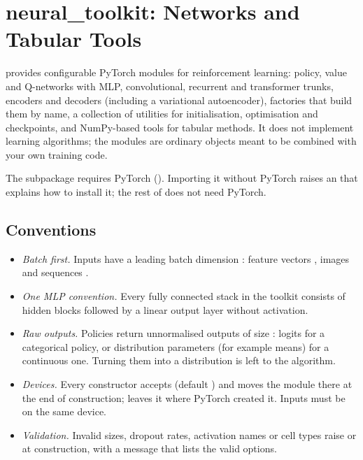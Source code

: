 \chapter{neural\_toolkit: Networks and Tabular Tools}\label{chap:neural}
\begingroup\setlength{\emergencystretch}{3em}%

 provides configurable PyTorch modules for
reinforcement learning: policy, value and Q-networks with MLP, convolutional,
recurrent and transformer trunks, encoders and decoders (including a
variational autoencoder), factories that build them by name, a collection of
utilities for initialisation, optimisation and checkpoints, and NumPy-based
tools for tabular methods. It does not implement learning algorithms; the
modules are ordinary  objects meant to be combined with
your own training code.

The subpackage requires PyTorch (). Importing it
without PyTorch raises an  that explains how to install it;
the rest of  does not need PyTorch.

\section{Conventions}\label{sec:neural-conventions}

\begin{itemize}
  \item \emph{Batch first.} Inputs have a leading batch dimension :
    feature vectors , images  and sequences
    .
  \item \emph{One MLP convention.} Every fully connected stack in the
    toolkit consists of hidden blocks
     followed by a
    linear output layer without activation.
  \item \emph{Raw outputs.} Policies return unnormalised outputs of size
    : logits for a categorical policy, or distribution
    parameters (for example means) for a continuous one. Turning them into a
    distribution is left to the algorithm.
  \item \emph{Devices.} Every constructor accepts  (default
    ) and moves the module there at the end of construction;
     leaves it where PyTorch created it. Inputs must be on
    the same device.
  \item \emph{Validation.} Invalid sizes, dropout rates, activation names or
    cell types raise  or  at construction,
    with a message that lists the valid options.
\end{itemize}

